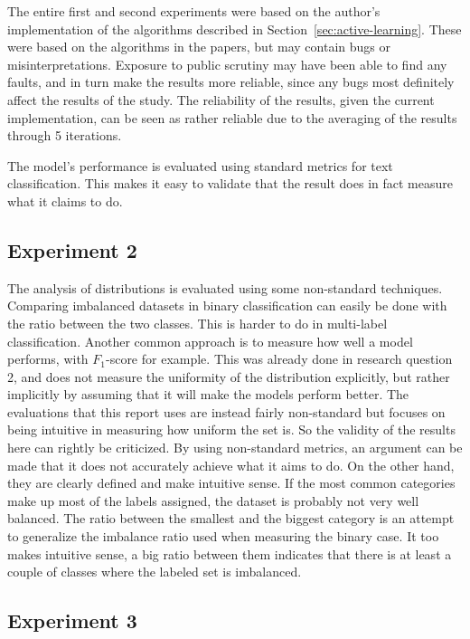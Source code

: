 The entire first and second experiments were based on the author's implementation of the algorithms described in Section~\ref{sec:active-learning}.
These were based on the algorithms in the papers, but may contain bugs or misinterpretations.
Exposure to public scrutiny may have been able to find any faults, and in turn make the results more reliable, since any bugs most definitely affect the results of the study.
The reliability of the results, given the current implementation, can be seen as rather reliable due to the averaging of the results through 5 iterations.

The model's performance is evaluated using standard metrics for text classification.
This makes it easy to validate that the result does in fact measure what it claims to do.

\subsection{Experiment 2}

The analysis of distributions is evaluated using some non-standard techniques.
Comparing imbalanced datasets in binary classification can easily be done with the ratio between the two classes.
This is harder to do in multi-label classification. 
Another common approach is to measure how well a model performs, with $F_1$-score for example.
This was already done in research question 2, and does not measure the uniformity of the distribution explicitly, but rather implicitly by assuming that it will make the models perform better.
The evaluations that this report uses are instead fairly non-standard but focuses on being intuitive in measuring how uniform the set is.
So the validity of the results here can rightly be criticized.
By using non-standard metrics, an argument can be made that it does not accurately achieve what it aims to do.
On the other hand, they are clearly defined and make intuitive sense.
If the most common categories make up most of the labels assigned, the dataset is probably not very well balanced.
The ratio between the smallest and the biggest category is an attempt to generalize the imbalance ratio used when measuring the binary case.
It too makes intuitive sense, a big ratio between them indicates that there is at least a couple of classes where the labeled set is imbalanced.

\subsection{Experiment 3}

